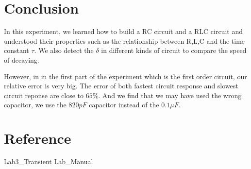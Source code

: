 \documentclass{article}
\begin{document}
\section{Conclusion}


In this experiment, we learned how to build a RC circuit and a RLC circuit and understood their properties such as the relationship between R,L,C and the time constant $\tau$. We also detect the $\delta$ in different kinds of circuit to compare the speed of decaying. 

However, in in the first part of the experiment which is the first order circuit, our relative error is very big. The error of both fastest circuit response and slowest circuit reponse are close to $65\%$. And we find that we may have used the wrong capacitor, we use the $820pF$ capacitor instead of the $0.1\mu F$.
\section{Reference}

Lab3\_Transient Lab\_Manual
\end{document}
